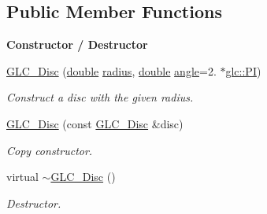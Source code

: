 \subsection*{Public Member Functions}
\begin{Indent}{\bf Constructor / Destructor}\par
\begin{DoxyCompactItemize}
\item 
\hyperlink{class_g_l_c___disc_a51e01749eda27f668863fe129d981b96}{G\-L\-C\-\_\-\-Disc} (\hyperlink{_super_l_u_support_8h_a8956b2b9f49bf918deed98379d159ca7}{double} \hyperlink{class_g_l_c___disc_ab5dc631e888b10d7f24784d98c957315}{radius}, \hyperlink{_super_l_u_support_8h_a8956b2b9f49bf918deed98379d159ca7}{double} \hyperlink{glext_8h_a9e06c1f76a20fed54ca742cd25cb02c4}{angle}=2. $\ast$\hyperlink{namespaceglc_ad0f268df7555a0084f6f242e599a0572}{glc\-::\-P\-I})
\begin{DoxyCompactList}\small\item\em Construct a disc with the given radius. \end{DoxyCompactList}\item 
\hyperlink{class_g_l_c___disc_ab325d5bef8d407897d37414400576249}{G\-L\-C\-\_\-\-Disc} (const \hyperlink{class_g_l_c___disc}{G\-L\-C\-\_\-\-Disc} \&disc)
\begin{DoxyCompactList}\small\item\em Copy constructor. \end{DoxyCompactList}\item 
virtual \hyperlink{class_g_l_c___disc_a25de3547a69368154579709328b33fe0}{$\sim$\-G\-L\-C\-\_\-\-Disc} ()
\begin{DoxyCompactList}\small\item\em Destructor. \end{DoxyCompactList}\end{DoxyCompactItemize}
\end{Indent}
